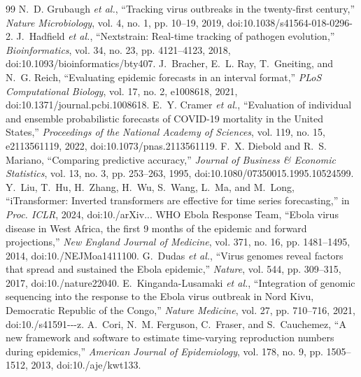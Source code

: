 \begin{thebibliography}{99}
 N.~D. Grubaugh \emph{et al.}, ``Tracking virus outbreaks in the twenty-first century,'' \emph{Nature Microbiology}, vol. 4, no. 1, pp. 10--19, 2019, doi:10.1038/s41564-018-0296-2.
 J.~Hadfield \emph{et al.}, ``Nextstrain: Real-time tracking of pathogen evolution,'' \emph{Bioinformatics}, vol. 34, no. 23, pp. 4121--4123, 2018, doi:10.1093/bioinformatics/bty407.
 J.~Bracher, E.~L. Ray, T.~Gneiting, and N.~G. Reich, ``Evaluating epidemic forecasts in an interval format,'' \emph{PLoS Computational Biology}, vol. 17, no. 2, e1008618, 2021, doi:10.1371/journal.pcbi.1008618.
 E.~Y. Cramer \emph{et al.}, ``Evaluation of individual and ensemble probabilistic forecasts of COVID-19 mortality in the United States,'' \emph{Proceedings of the National Academy of Sciences}, vol. 119, no. 15, e2113561119, 2022, doi:10.1073/pnas.2113561119.
 F.~X. Diebold and R.~S. Mariano, ``Comparing predictive accuracy,'' \emph{Journal of Business \& Economic Statistics}, vol. 13, no. 3, pp. 253--263, 1995, doi:10.1080/07350015.1995.10524599.
 Y.~Liu, T.~Hu, H.~Zhang, H.~Wu, S.~Wang, L.~Ma, and M.~Long, ``iTransformer: Inverted transformers are effective for time series forecasting,'' in \emph{Proc. ICLR}, 2024, doi:10./\allowbreak arXiv...\allowbreak 
{} WHO Ebola Response Team, ``Ebola virus disease in West Africa, the first 9 months of the epidemic and forward projections,'' \emph{New England Journal of Medicine}, vol. 371, no. 16, pp. 1481--1495, 2014, doi:10./\allowbreak NEJMoa1411100.\allowbreak 
{} G.~Dudas \emph{et al.}, ``Virus genomes reveal factors that spread and sustained the Ebola epidemic,'' \emph{Nature}, vol. 544, pp. 309--315, 2017, doi:10./\allowbreak nature22040.\allowbreak 
{} E.~Kinganda-Lusamaki \emph{et al.}, ``Integration of genomic sequencing into the response to the Ebola virus outbreak in Nord Kivu, Democratic Republic of the Congo,'' \emph{Nature Medicine}, vol. 27, pp. 710--716, 2021, doi:10./\allowbreak s41591---\allowbreak z.\allowbreak 
{} A.~Cori, N.~M. Ferguson, C.~Fraser, and S.~Cauchemez, ``A new framework and software to estimate time-varying reproduction numbers during epidemics,'' \emph{American Journal of Epidemiology}, vol. 178, no. 9, pp. 1505--1512, 2013, doi:10./\allowbreak aje/\allowbreak kwt133.\allowbreak 

\end{thebibliography}
